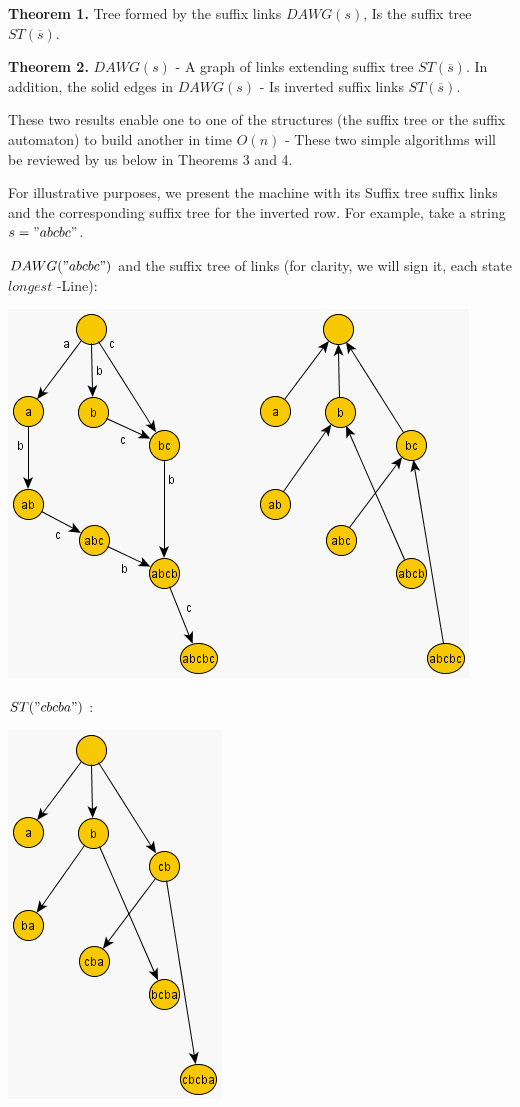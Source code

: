 \textbf{Theorem 1.} Tree formed by the suffix links $DAWG (s)$, Is the suffix tree $ST (\overline {s})$.

\textbf{Theorem 2.} $DAWG (s)$ - A graph of links extending suffix tree $ST (\overline {s})$. In addition, the solid edges in $DAWG (s)$ - Is inverted suffix links $ST (\overline {s})$.

These two results enable one to one of the structures (the suffix tree or the suffix automaton) to build another in time $O (n)$ - These two simple algorithms will be reviewed by us below in Theorems 3 and 4.

For illustrative purposes, we present the machine with its Suffix tree suffix links and the corresponding suffix tree for the inverted row. For example, take a string $s =" abcbc"$.

$DAWG (" abcbc")$ and the suffix tree of links (for clarity, we will sign it, each state $longest$ -Line):

\includegraphics[scale=0.5]{9.png}

$ST (" cbcba")$ :

\includegraphics[scale=0.5]{10.png}

